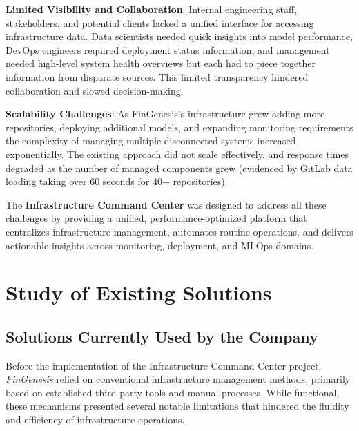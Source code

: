 \textbf{Limited Visibility and Collaboration}: Internal engineering staff, stakeholders, and potential clients lacked a unified interface for accessing infrastructure data. Data scientists needed quick insights into model performance, DevOps engineers required deployment status information, and management needed high-level system health overviews but each had to piece together information from disparate sources. This limited transparency hindered collaboration and slowed decision-making.

\textbf{Scalability Challenges}: As FinGenesis's infrastructure grew adding more repositories, deploying additional models, and expanding monitoring requirements the complexity of managing multiple disconnected systems increased exponentially. The existing approach did not scale effectively, and response times degraded as the number of managed components grew (evidenced by GitLab data loading taking over 60 seconds for 40+ repositories).

The \textbf{Infrastructure Command Center} was designed to address all these challenges by providing a unified, performance-optimized platform that centralizes infrastructure management, automates routine operations, and delivers actionable insights across monitoring, deployment, and MLOps domains.

\newpage
\section{Study of Existing Solutions}

\subsection{Solutions Currently Used by the Company}

Before the implementation of the Infrastructure Command Center project, \textit{FinGenesis} relied on conventional infrastructure management methods, primarily based on established third-party tools and manual processes. While functional, these mechanisms presented several notable limitations that hindered the fluidity and efficiency of infrastructure operations.

